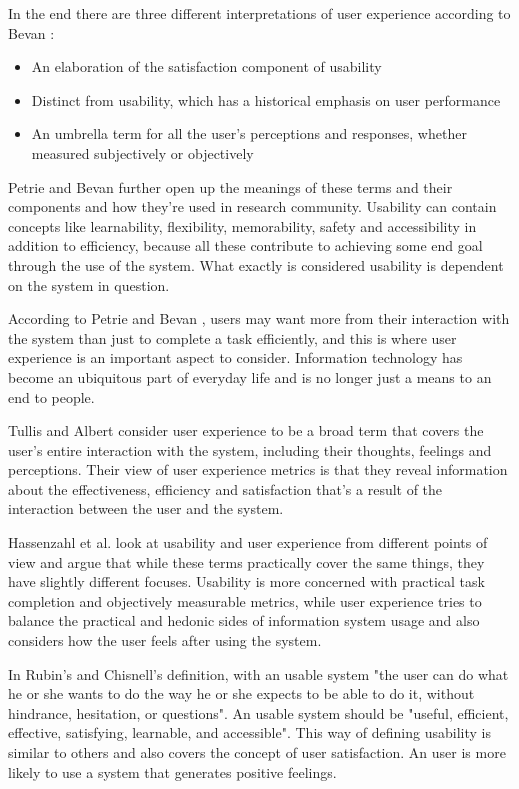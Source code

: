 In the end there are three different interpretations of user experience according to Bevan \cite{bevan2009difference}: \begin{itemize}
\item An  elaboration  of  the  satisfaction  component  of usability
\item Distinct  from  usability,  which  has  a  historical emphasis on user performance
\item An  umbrella  term  for  all  the  user’s  perceptions  and responses,  whether  measured  subjectively  or objectively
\end{itemize}

Petrie and Bevan \cite{bevanevaluation} further open up the meanings of these terms and their components and how they're used in research community. Usability can contain concepts like learnability, flexibility, memorability, safety and accessibility in addition to efficiency, because all these contribute to achieving some end goal through the use of the system. What exactly is considered usability is dependent on the system in question. 

According to Petrie and Bevan \cite{bevanevaluation}, users may want more from their interaction with the system than just to complete a task efficiently, and this is where user experience is an important aspect to consider. Information technology has become an ubiquitous part of everyday life and is no longer just a means to an end to people.

Tullis and Albert \cite{albert2013measuring} consider user experience to be a broad term that covers the user's entire interaction with the system, including their thoughts, feelings and perceptions. Their view of user experience metrics is that they reveal information about the effectiveness, efficiency and satisfaction that's a result of the interaction between the user and the system.

Hassenzahl et al. \cite{hassenzahl2006user} look at usability and user experience from different points of view and argue that while these terms practically cover the same things, they have slightly different focuses. Usability is more concerned with practical task completion and objectively measurable metrics, while user experience tries to balance the practical and hedonic sides of information system usage and also considers how the user feels after using the system.

In Rubin's and Chisnell's \cite{rubin2008handbook} definition, with an usable system "the user can do what he or she wants to do the way he or she expects to be able to do it, without hindrance, hesitation, or questions". An usable system should be "useful, efficient, effective, satisfying, learnable, and accessible". This way of defining usability is similar to others and also covers the concept of user satisfaction. An user is more likely to use a system that generates positive feelings.

